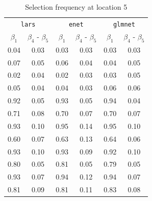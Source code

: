 \documentclass[authoryear, review, 11pt]{elsarticle}
\begin{document}
		\begin{table}[ht]
		\begin{center}
		\begin{tabular}{cc|cc|cc}
		\multicolumn{2}{c}{\texttt{lars}} & \multicolumn{2}{c}{\texttt{enet}} & \multicolumn{2}{c}{\texttt{glmnet}} \\
		 $\beta_1$ & $\beta_4$ - $\beta_5$ & $\beta_1$ & $\beta_4$ - $\beta_5$ & $\beta_1$ & $\beta_4$ - $\beta_5$ \\ 
		  \hline
		0.04 & 0.03 & 0.03 & 0.03 & 0.03 & 0.03 \\ 
		  0.07 & 0.05 & 0.06 & 0.04 & 0.04 & 0.05 \\ 
		  0.02 & 0.04 & 0.02 & 0.03 & 0.03 & 0.05 \\ 
		  0.05 & 0.04 & 0.04 & 0.03 & 0.06 & 0.06 \\ 
		  \hline
		  0.92 & 0.05 & 0.93 & 0.05 & 0.94 & 0.04 \\ 
		  0.71 & 0.08 & 0.70 & 0.07 & 0.70 & 0.07 \\ 
		  0.93 & 0.10 & 0.95 & 0.14 & 0.95 & 0.10 \\ 
		  0.60 & 0.07 & 0.63 & 0.13 & 0.64 & 0.06 \\ 
		  \hline
		  0.93 & 0.10 & 0.93 & 0.09 & 0.92 & 0.10 \\ 
		  0.80 & 0.05 & 0.81 & 0.05 & 0.79 & 0.05 \\ 
		  0.93 & 0.07 & 0.94 & 0.12 & 0.94 & 0.07 \\ 
		  0.81 & 0.09 & 0.81 & 0.11 & 0.83 & 0.08 \\ 
		  \end{tabular}
		\caption{Selection frequency at location 5\label{table:loc5-selection}}
		\end{center}
		\end{table}
		
\end{document}
